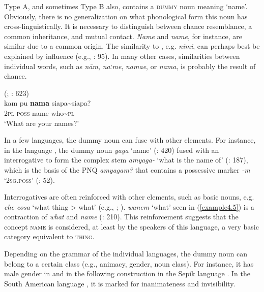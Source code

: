 \documentclass[output=paper,colorlinks,citecolor=brown]{langscibook}
\begin{document}
Type A, and sometimes Type B also, contains a \textsc{dummy} noun meaning ‘name’. Obviously, there is no generalization on what phonological form this noun has cross-linguistically. It is necessary to distinguish between chance resemblance, a common inheritance, and mutual contact.  \textit{Name} and  \textit{name}, for instance, are similar due to a common  origin. The similarity to , e.g.  \textit{nimi}, can perhaps best be explained by  influence (e.g., \citealt{Anthony2007}: 95). In many other cases, similarities between individual words, such as  \textit{nām},  \textit{naːme},  \textit{namae}, or  \textit{nama}, is probably the result of chance.

\ea
    \label{example4.31}
     (; \citealt{Kluge2017}: 623)\\
    \gll kam		pu		\textbf{nama}	siapa{\textasciitilde}siapa?\\
    2\textsc{pl}		\textsc{poss}		name	who{\textasciitilde}\textsc{pl}\\
    \glt ‘What are your names?’
    \z

\begin{sloppypar}
In a few languages, the dummy noun can fuse with other elements. For instance, in the  language , the dummy noun \textit{yaga} ‘name’ (\citealt{Senft1986}: 420) fused with an interrogative to form the complex stem \textit{amyaga-} ‘what is the name of’ (\citealt{Senft1986}: 187), which is the basis of the PNQ \textit{amyagam?} that contains a possessive marker \textit{-m} ‘2\textsc{sg.poss}’ (\citealt{Senft1986}: 52).
\end{sloppypar}

Interrogatives are often reinforced with other elements, such as basic nouns, e.g.  \textit{che cosa} ‘what thing > what’ (e.g., \citealt{Diessel2003}; \citealt{Hölzl2018a}).  \textit{wanem} ‘what’ seen in (\ref{example4.5}) is a contraction of  \textit{what} and \textit{name} (\citealt{Wurm1985}: 210). This reinforcement suggests that the concept \textsc{name} is considered, at least by the speakers of this language, a very basic category equivalent to \textsc{thing}.

Depending on the grammar of the individual languages, the dummy noun can belong to a certain class (e.g., animacy, gender, noun class). For instance, it has male gender in  and in the following construction in the Sepik language . In the South American language , it is marked for inanimateness and invisibility.
\end{document}
